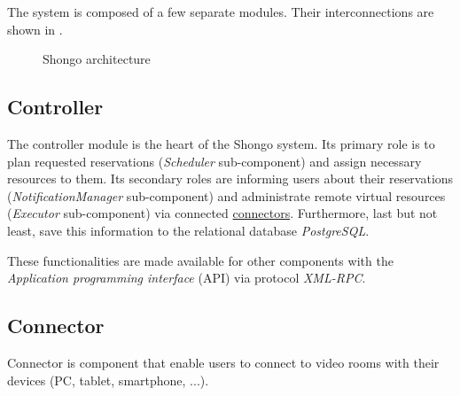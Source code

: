 The system is composed of a few separate modules. Their interconnections are shown in .
\begin{figure}[!ht]
  \centering
  \caption{Shongo architecture}
%   
  \label{architecture}
\end{figure}

\subsection{Controller} \label{controller}
The controller module is the heart of the Shongo system. Its primary role is to plan requested reservations (\emph{Scheduler} sub-component) and assign necessary resources to them. Its secondary roles are informing users about their reservations (\emph{NotificationManager} sub-component) and administrate remote virtual resources (\emph{Executor} sub-component) via connected \hyperref[connector]{connectors}. Furthermore, last but not least, save this information to the relational database \emph{PostgreSQL}.

These functionalities are made available for other components with the \emph{Application programming interface} (API) via protocol \emph{XML-RPC}.

\subsection{Connector} \label{connector}
Connector is component that enable users to connect to video rooms with their devices (PC, tablet, smartphone, ...).

